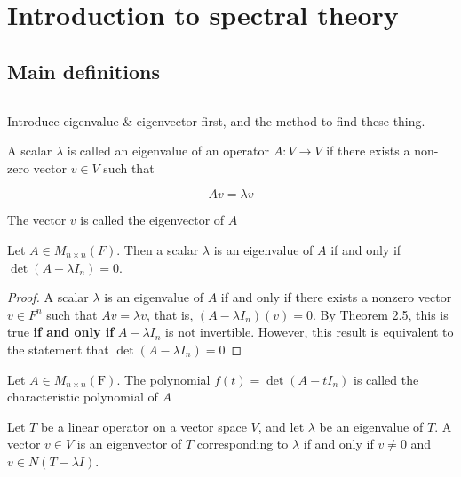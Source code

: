 


\cfoot{\thepage} %

\section{Introduction to spectral theory}

\subsection{Main definitions}$ $

\begin{tcolorbox}
	Introduce eigenvalue \& eigenvector first, and the method to find these thing.
\end{tcolorbox}

\begin{defn}
	A scalar $\lambda$ is called an eigenvalue of an operator $A:V \rightarrow V$ if there exists a non-zero vector $v \in V$ such that 
	
	$$Av = \lambda v$$
	
	The vector $v$ is called the eigenvector of $A$
\end{defn}

\begin{thm*}
	Let $A \in M_{n \times n}(F).$ Then a scalar $\lambda$ is an eigenvalue of $A$ if and only if $\det(A - \lambda I_{n}) = 0$.
\end{thm*}

\begin{proof}
	A scalar $\lambda$ is an eigenvalue of $A$ if and only if there exists a nonzero vector $v \in F^n$ such that $A v = \lambda v$, that is, $(A - \lambda I_n)(v) = 0$. By Theorem 2.5, this is true \textbf{if and only if} $A - \lambda I_n$ is not invertible. However, this result is equivalent to the statement that $\det(A - \lambda I_n)=0$
\end{proof}

\begin{defn}
	Let $A \in M_{n\times n}(\mathrm{F}).$ The polynomial $f(t) = \det (A - tI_n)$ is called the characteristic polynomial of $A$
\end{defn}

\begin{thm*}
	Let $T$ be a linear operator on a vector space $V$, and let $\lambda$ be an eigenvalue of $T$. A vector $v \in V$ is an eigenvector of $T$ corresponding to $\lambda$ if and only if $v \neq 0$ and $v \in N(T - \lambda I)$.
\end{thm*}

